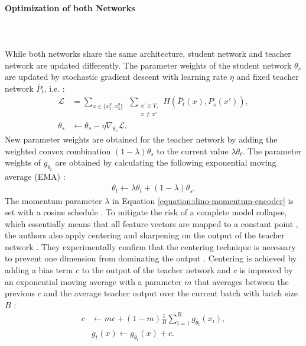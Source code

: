 \paragraph{Optimization of both Networks} \mbox{} \\
\\
While both networks share the same architecture, student network and teacher network are updated differently. 
The parameter weights of the student network $\theta_s$ are updated by stochastic gradient descent with learning rate $\eta$ and fixed teacher network $\bar{P}_t$, i.e. \citep{Caron2021}:
\begin{align}
	\mathcal{L}  &= \sum_{x \in \{x_1^g, x_2^g\}} \hspace{5pt} \sum_{\substack{ x\prime \in V, \\ x\neq x\prime}} H(\bar P_t(x),P_s(x\prime)), \\ 
	\theta_s &\leftarrow \theta_s - \eta \nabla_{\theta_s} \mathcal{L}.
\end{align}
New parameter weights are obtained for the teacher network by adding the weighted convex combination $(1-\lambda)\theta_s$ to the current value $\lambda\theta_t$.
The parameter weights of $g_{\theta_t}$ are obtained by calculating the following exponential moving average (EMA) \citep{Grill2020,Caron2021}: 
\begin{align}
	\theta_t \leftarrow \lambda \theta_t + (1-\lambda) \theta_s.
	\label{equation:dino-momentum-encoder}
\end{align}
The momentum parameter $\lambda$ in Equation \ref{equation:dino-momentum-encoder} is set with a cosine schedule \citep{Grill2020}.
To mitigate the risk of a complete model collapse, which essentially means that all feature vectors are mapped to a constant point \citep{Jing2022}, the authors also apply centering and sharpening on the output of the teacher network \citep{Caron2021}.
They experimentally confirm that the centering technique is necessary to prevent one dimension from dominating the output \citep{Caron2021}.
Centering is achieved by adding a bias term $c$ to the output of the teacher network and $c$ is improved by an exponential moving average with a parameter $m$ that averages between the previous $c$ and the average teacher output over the current batch with batch size $B$ \citep{Caron2021}:
\begin{align}
	c & \leftarrow mc + (1-m) \frac{1}{B}\sum_{i=1}^B g_{\theta_t}(x_i), \\
	& g_t(x) \leftarrow g_{\theta_t}(x) + c.
	\label{equation:dino-centering}
\end{align}
